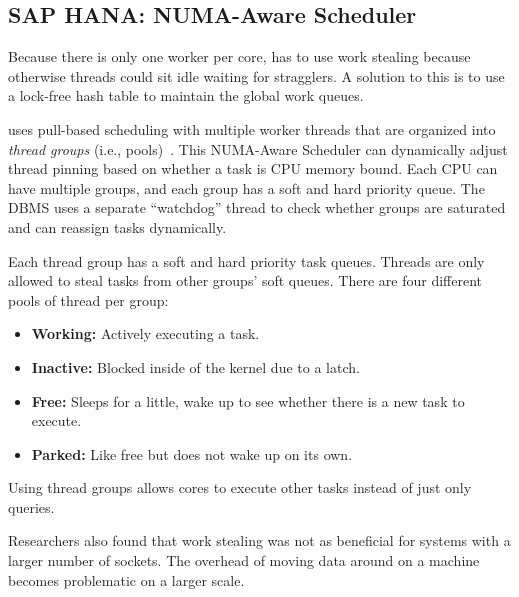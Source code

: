 \documentclass[11pt]{article}
\begin{document}
\subsection*{SAP HANA: NUMA-Aware Scheduler}
Because there is only one worker per core,  has to use work stealing because otherwise 
threads could sit idle waiting for stragglers. A solution to this is to use a lock-free hash table 
to maintain the global work queues.

 uses pull-based scheduling with multiple worker threads that are organized into 
\textit{thread groups} (i.e., pools)~\cite{Psaroudakis2015}. This NUMA-Aware Scheduler 
can dynamically adjust thread pinning based on whether a task is CPU memory bound. Each CPU can have 
multiple groups, and each group has a soft and hard priority queue. The DBMS uses a separate 
``watchdog'' thread to check whether groups are saturated and can reassign tasks dynamically.

Each thread group has a soft and hard priority task queues. Threads are only allowed to steal tasks 
from other groups' soft queues. There are four different pools of thread per group:

\begin{itemize}
    \item \textbf{Working:}
     Actively executing a task.
     
     \item \textbf{Inactive:}
     Blocked inside of the kernel due to a latch.
 
     \item \textbf{Free:}
     Sleeps for a little, wake up to see whether there is a new task to execute.
 
     \item \textbf{Parked:}
     Like free but does not wake up on its own.
\end{itemize}

Using thread groups allows cores to execute other tasks instead of just only queries.

Researchers also found that work stealing was not as beneficial for systems with a 
larger number of sockets. The overhead of moving data around on a machine becomes problematic on a 
larger scale.

\end{document}
